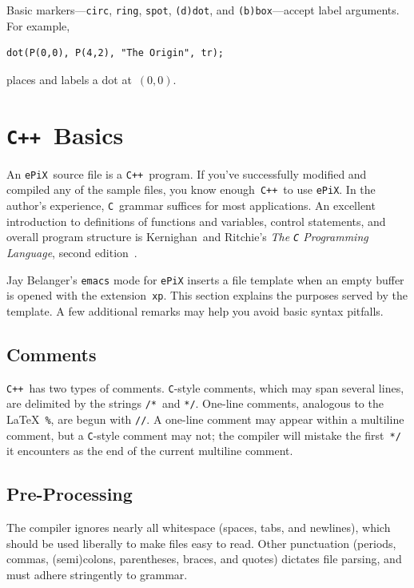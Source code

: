 \documentclass[12pt]{report}
\newcommand{\code}[1]{\texttt{#1}}
\newcommand{\ePiX}{\code{ePiX}}
\newcommand{\CXX}{\code{C++}}
\begin{document}
Basic markers---\code{circ}, \code{ring}, \code{spot}, \code{(d)dot},
and \code{(b)box}---accept label arguments. For example, 
\begin{verbatim}
dot(P(0,0), P(4,2), "The Origin", tr);
\end{verbatim}
places and labels a dot at~$(0,0)$. 



\section{\CXX\ Basics}

An \ePiX\ source file is a \CXX~program. If you've successfully
modified and compiled any of the sample files, you know enough~\CXX\ 
to use \ePiX. In the author's experience, \code{C}~grammar suffices
for most applications.  An excellent introduction to definitions of
functions and variables, control statements, and overall program
structure is Kernighan~and Ritchie's \emph{The \code{C} Programming
  Language}, second edition~\cite{KnR}.


Jay Belanger's \code{emacs} mode for \code{ePiX} inserts a file
template when an empty buffer is opened with the extension~\code{xp}.
This section explains the purposes served by the template. A few
additional remarks may help you avoid basic syntax pitfalls.


\subsection*{Comments}

\CXX\ has two types of comments. \code{C}-style comments, which may
span several lines, are delimited by the strings \code{/*}~and
\code{*/}. One-line comments, analogous to the \LaTeX~\code{\%}, are
begun with \code{//}. A one-line comment may appear within a multiline
comment, but a \code{C}-style comment may not; the compiler will
mistake the first~\code{*/} it encounters as the end of the current
multiline comment.


\subsection*{Pre-Processing}

The compiler ignores nearly all whitespace (spaces, tabs, and
newlines), which should be used liberally to make files easy to read.
Other punctuation (periods, commas, (semi)colons, parentheses, braces,
and quotes) dictates file parsing, and must adhere stringently to
grammar.
\end{document}
